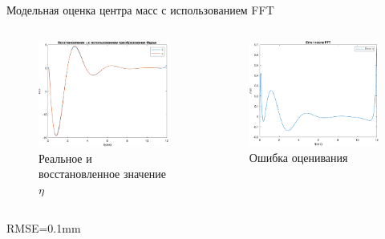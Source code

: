 \documentclass[10pt]{beamer}
\begin{document}
\begin{frame}{Модельная оценка центра масс с использованием FFT}
	\begin{columns}
		\begin{figure}[h!]
			\includegraphics[width=1\linewidth]{images/eta_after_FFT.png}
			\caption{Реальное и восстановленное значение $\eta$}
		\end{figure}
		\begin{figure}[h!]
			\includegraphics[width=1\linewidth]{images/error_after_fft.png}
			\caption{Ошибка оценивания}
		\end{figure}
	\end{columns}
RMSE=0.1mm
\end{frame}
\end{document}
